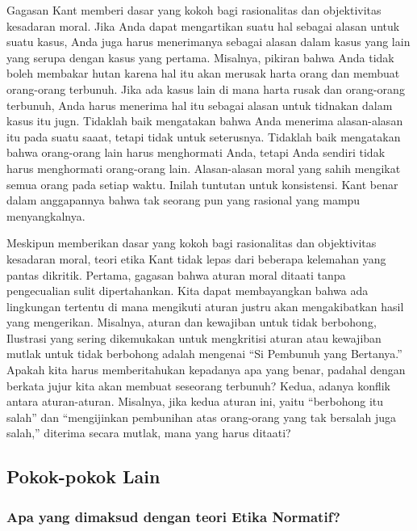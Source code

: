 \documentclass[11pt,twoside,a5paper,openany]{memoir}
\begin{document}
Gagasan Kant memberi dasar yang kokoh bagi rasionalitas dan objektivitas
kesadaran moral. Jika Anda dapat mengartikan suatu hal sebagai alasan
untuk suatu kasus, Anda juga harus menerimanya sebagai alasan dalam
kasus yang lain yang serupa dengan kasus yang pertama. Misalnya, pikiran
bahwa Anda tidak boleh membakar hutan karena hal itu akan merusak harta
orang dan membuat orang-orang terbunuh. Jika ada kasus lain di mana
harta rusak dan orang-orang terbunuh, Anda harus menerima hal itu
sebagai alasan untuk tidnakan dalam kasus itu jugn. Tidaklah baik
mengatakan bahwa Anda menerima alasan-alasan itu pada suatu saaat,
tetapi tidak untuk seterusnya. Tidaklah baik mengatakan bahwa
orang-orang lain harus menghormati Anda, tetapi Anda sendiri tidak harus
menghormati orang-orang lain. Alasan-alasan moral yang sahih mengikat
semua orang pada setiap waktu. Inilah tuntutan untuk konsistensi. Kant
benar dalam anggapannya bahwa tak seorang pun yang rasional yang mampu
menyangkalnya.

Meskipun memberikan dasar yang kokoh bagi rasionalitas dan objektivitas
kesadaran moral, teori etika Kant tidak lepas dari beberapa kelemahan
yang pantas dikritik. Pertama, gagasan bahwa aturan moral ditaati tanpa
pengecualian sulit dipertahankan. Kita dapat membayangkan bahwa ada
lingkungan tertentu di mana mengikuti aturan justru akan mengakibatkan
hasil yang mengerikan. Misalnya, aturan dan kewajiban untuk tidak
berbohong, Ilustrasi yang sering dikemukakan untuk mengkritisi aturan
atau kewajiban mutlak untuk tidak berbohong adalah mengenai ``Si
Pembunuh yang Bertanya.'' Apakah kita harus memberitahukan kepadanya apa
yang benar, padahal dengan berkata jujur kita akan membuat seseorang
terbunuh? Kedua, adanya konflik antara aturan-aturan. Misalnya, jika
kedua aturan ini, yaitu ``berbohong itu salah'' dan ``mengijinkan
pembunihan atas orang-orang yang tak bersalah juga salah,'' diterima
secara mutlak, mana yang harus ditaati?

\hypertarget{pokok-pokok-lain-6}{%
\subsection{Pokok-pokok Lain}\label{pokok-pokok-lain-6}}

\hypertarget{apa-yang-dimaksud-dengan-teori-etika-normatif}{%
\subsubsection{Apa yang dimaksud dengan teori Etika
Normatif?}\label{apa-yang-dimaksud-dengan-teori-etika-normatif}}
\end{document}
